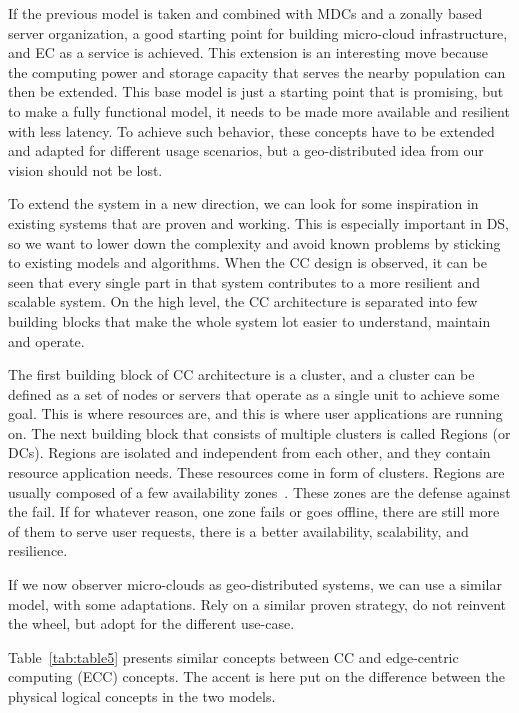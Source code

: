 If the previous model is taken and combined with MDCs and a zonally based server organization, a good starting point for building micro-cloud infrastructure, and EC as a service is achieved. This extension is an interesting move because the computing power and storage capacity that serves the nearby population can then be extended. This base model is just a starting point that is promising, but to make a fully functional model, it needs to be made more available and resilient with less latency. To achieve such behavior, these concepts have to be extended and adapted for different usage scenarios, but a geo-distributed idea from our vision should not be lost.

To extend the system in a new direction, we can look for some inspiration in existing systems that are proven and working. This is especially important in DS, so we want to lower down the complexity and avoid known problems by sticking to existing models and algorithms. When the CC design is observed, it can be seen that every single part in that system contributes to a more resilient and scalable system. On the high level, the CC architecture is separated into few building blocks that make the whole system lot easier to understand, maintain and operate.

The first building block of CC architecture is a cluster, and a cluster can be defined as a set of nodes or servers that operate as a single unit to achieve some goal. This is where resources are, and this is where user applications are running on. The next building block that consists of multiple clusters is called Regions (or DCs). Regions are isolated and independent from each other, and they contain resource application needs. These resources come in form of clusters. Regions are usually composed of a few availability zones~\cite{SouzaMFAK19}. These zones are the defense against the fail. If for whatever reason, one zone fails or goes offline, there are still more of them to serve user requests, there is a better availability, scalability, and resilience.

If we now observer micro-clouds as geo-distributed systems, we can use a similar model, with some adaptations. Rely on a similar proven strategy, do not reinvent the wheel, but adopt for the different use-case.

Table~\ref{tab:table5} presents similar concepts between CC and edge-centric computing (ECC) concepts. The accent is here put on the difference between the physical logical concepts in the two models.

